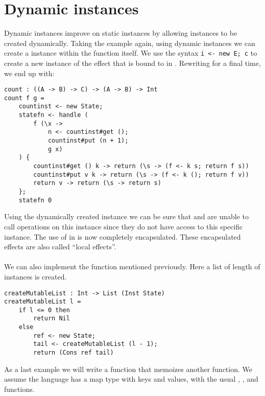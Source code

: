 \section{Dynamic instances} \label{section:background-dynamicinst}

Dynamic instances improve on static instances by allowing instances to be created dynamically.
Taking the  example again, using dynamic instances we can create a  instance within the  function itself.
We use the syntax \texttt{i <- new E; c} to create a new instance of the  effect that is bound to  in .
Rewriting  for a final time, we end up with:

\begin{verbatim}
count : ((A -> B) -> C) -> (A -> B) -> Int
count f g =
	countinst <- new State;
	statefn <- handle (
		f (\x ->
			n <- countinst#get ();
			countinst#put (n + 1);
			g x)
	) {
		countinst#get () k -> return (\s -> (f <- k s; return f s))
		countinst#put v k -> return (\s -> (f <- k (); return f v))
		return v -> return (\s -> return s)
	};
	statefn 0
\end{verbatim}

Using the dynamically created instance  we can be sure that  and  are unable to call operations on this instance since they do not have access to this specific instance. The use of  in  is now completely encapsulated. These encapsulated effects are also called ``local effects''.
\\\\
We can also implement the function  mentioned previously. Here a list of length  of  instances is created.

\begin{verbatim}
createMutableList : Int -> List (Inst State)
createMutableList l =
	if l <= 0 then
		return Nil
	else
		ref <- new State;
		tail <- createMutableList (l - 1);
		return (Cons ref tail)
\end{verbatim}

As a last example we will write a function that memoizes another function. We assume the language has a map type  with  keys and values, with the usual , ,  and  functions.

